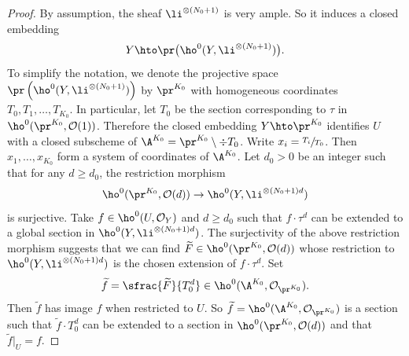 \begin{proof}[Proof]
By assumption, the sheaf $\li^{\otimes (N_0+1)}$ is very ample. So it induces a closed embedding\vspace*{-3pt}
\[
Y\hto \pr\bigl(\ho^0(Y, \li^{\otimes (N_0+1)}) \bigr).
\]
To simplify the notation, we denote the projective space $\pr\left(\ho^0(Y, \li^{\otimes (N_0+1)})\right)$ by $\pr^{K_0}$ with homogeneous coordinates $T_0,T_1,\dots, T_{K_0}$. In particular, let $T_0$ be the section corresponding to $\tau$ in $\ho^0(\pr^{K_0},\mathcal{O}(1))$. Therefore the closed embedding $Y\hto \pr^{K_0}$ identifies $U$ with a closed subscheme of $\A^{K_0}=\pr^{K_0}\setminus\div T_0$. Write $x_i=\sfrac{T_i}{T_0}$. Then $x_1,\dots, x_{K_0}$ form a system of coordinates of $\A^{K_0}$. Let $d_0>0$ be an integer such that for any $d\geq d_0$, the restriction morphism
\[
\ho^0(\pr^{K_0},\mathcal{O}(d)) \to \ho^0(Y, \li^{\otimes (N_0+1)d})
\]
is surjective. Take $f\in \ho^0(U, \mathcal{O}_Y)$ and $d\geq d_0$ such that $f\cdot \tau^d$ can be extended to a global section in $ \ho^0(Y, \li^{\otimes (N_0+1)d})$. The surjectivity of the above restriction morphism suggests that we can find $\widetilde{F} \in\ho^0(\pr^{K_0},\mathcal{O}(d))$ whose restriction to $\ho^0(Y, \li^{\otimes (N_0+1)d})$ is the chosen extension of $f\cdot \tau^d$. Set\vspace*{-3pt}
\[
\widetilde{f}= \sfrac{\widetilde{F}}{T_0^d}\in \ho^0(\A^{K_0},\mathcal{O}_{\pr^{K_0}}).
\]
Then $\widetilde{f}$ has image $f$ when restricted to $U$. So $\widetilde{f}= \ho^0(\A^{K_0},\mathcal{O}_{\pr^{K_0}})$ is a section such that $\widetilde{f}\cdot T_0^d$ can be extended to a section in $\ho^0(\pr^{K_0},\mathcal{O}(d))$ and that $\widetilde{f}|_U=f$.


\end{proof}
